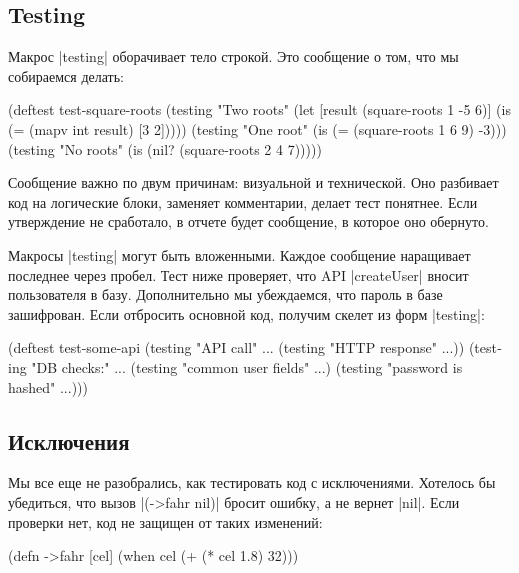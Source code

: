\subsection{Testing}

Макрос \spverb|testing| оборачивает тело строкой. Это сообщение о том, что мы
собираемся делать:

\begin{english}
  \begin{clojure}
(deftest test-square-roots
  (testing "Two roots"
    (let [result (square-roots 1 -5 6)]
      (is (= (mapv int result) [3 2]))))
  (testing "One root"
    (is (= (square-roots 1 6 9) -3)))
  (testing "No roots"
    (is (nil? (square-roots 2 4 7)))))
  \end{clojure}
\end{english}

Сообщение важно по двум причинам: визуальной и технической. Оно разбивает код на
логические блоки, заменяет комментарии, делает тест понятнее. Если утверждение
не сработало, в отчете будет сообщение, в которое оно обернуто.

Макросы \spverb|testing| могут быть вложенными. Каждое сообщение наращивает
последнее через пробел. Тест ниже проверяет, что API \spverb|createUser| вносит
пользователя в базу. Дополнительно мы убеждаемся, что пароль в базе
зашифрован. Если отбросить основной код, получим скелет из форм
\spverb|testing|:

\begin{english}
  \begin{clojure}
(deftest test-some-api
  (testing "API call" ...
    (testing "HTTP response" ...))
  (testing "DB checks:" ...
    (testing "common user fields" ...)
    (testing "password is hashed" ...)))
  \end{clojure}
\end{english}

\subsection{Исключения}

Мы все еще не разобрались, как тестировать код с исключениями. Хотелось бы
убедиться, что вызов \spverb|(->fahr nil)| бросит ошибку, а не вернет
\spverb|nil|. Если проверки нет, код не защищен от таких изменений:

\begin{english}
  \begin{clojure}
(defn ->fahr [cel]
  (when cel
    (+ (* cel 1.8) 32)))
  \end{clojure}
\end{english}

